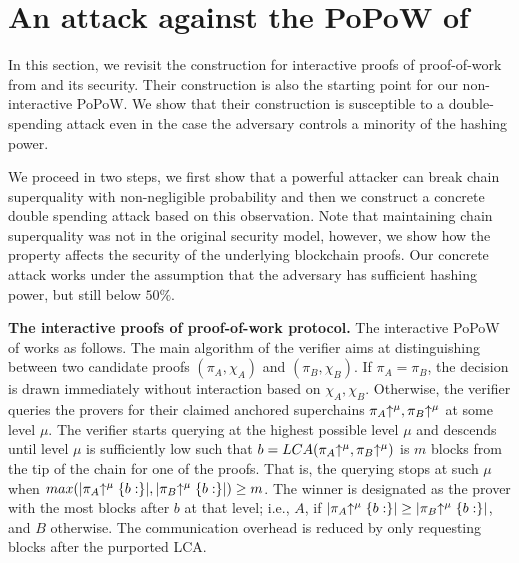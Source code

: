 \section{An attack against the PoPoW of \cite{KLS}}

In this section, we revisit the construction for interactive proofs of
proof-of-work from \cite{KLS} and its security.  Their construction is also the
starting point for our non-interactive PoPoW. We show that their
construction is susceptible to  a double-spending attack even in the case the
adversary controls a minority of the hashing power.

We proceed in two steps, we first show that a powerful attacker can break chain superquality with
non-negligible probability and then we construct a concrete double spending 
attack based on this observation.
Note that maintaining   chain superquality was  not in the original security model,  however,
we show how the property affects the security of the underlying blockchain proofs. Our  concrete attack works
under the assumption that the adversary has sufficient hashing power, but still
below $50\%$.

\noindent
\textbf{The interactive proofs of proof-of-work protocol.}
The interactive PoPoW of \cite{KLS} works as follows. The main algorithm of the verifier aims at distinguishing 
between two candidate proofs $(\pi_A, \chi_A)$ and $(\pi_B, \chi_B)$. If $\pi_A =
\pi_B$, the decision is drawn immediately without interaction based on
$\chi_A,\chi_B$. Otherwise, the verifier queries the provers for their claimed
anchored superchains $\pi_A\negthickspace\uparrow^\mu, \pi_B\negthickspace\uparrow^\mu$ at some level $\mu$.
The verifier starts querying at the highest possible level $\mu$ and descends
until level $\mu$ is sufficiently low such that $b = LCA(\pi_A\negthickspace\uparrow^\mu,
\pi_B\negthickspace\uparrow^\mu)$ is $m$ blocks from the tip of the chain for one of the proofs.
That is,
the querying stops at such $\mu$ when $max(|\pi_A\negthickspace\uparrow^\mu\{b:\}|,
|\pi_B\negthickspace\uparrow^\mu\{b:\}|) \geq m$. The winner is designated as the prover with
the most blocks after $b$ at that level; i.e., $A$, if $|\pi_A\negthickspace\uparrow^\mu\{b:\}|
\geq |\pi_B\negthickspace\uparrow^\mu\{b:\}|$, and $B$ otherwise. The communication overhead
is reduced by only requesting blocks after the purported LCA.

